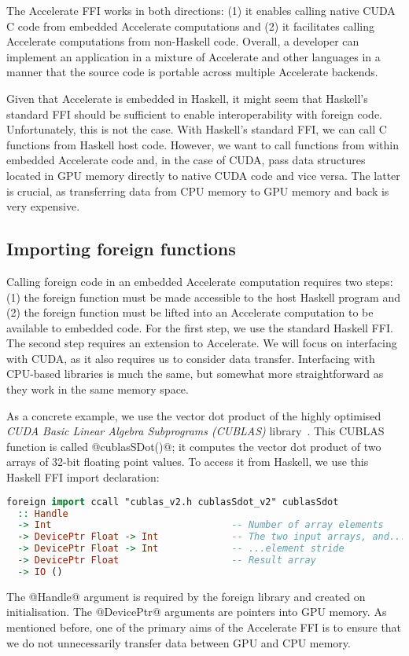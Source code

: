 The Accelerate FFI works in both directions: (1) it enables calling native CUDA C code from embedded Accelerate computations and (2) it facilitates calling Accelerate computations from non-Haskell code. Overall, a developer can implement an application in a mixture of Accelerate and other languages in a manner that the source code is portable across multiple Accelerate backends.

Given that Accelerate is embedded in Haskell, it might seem that Haskell's standard FFI should be sufficient to enable interoperability with foreign code. Unfortunately, this is not the case. With Haskell's standard FFI, we can call C functions from Haskell host code. However, we want to call functions from within embedded Accelerate code and, in the case of CUDA, pass data structures located in GPU memory directly to native CUDA code and vice versa. The latter is crucial, as transferring data from CPU memory to GPU memory and back is very expensive.

\subsection{Importing foreign functions}
\label{sec:foreign-import}

Calling foreign code in an embedded Accelerate computation requires two steps: (1) the foreign function must be made accessible to the host Haskell program and (2) the foreign function must be lifted into an Accelerate computation to be available to embedded code. For the first step, we use the standard Haskell FFI. The second step requires an extension to Accelerate. We will focus on interfacing with CUDA, as it also requires us to consider data transfer. Interfacing with CPU-based libraries is much the same, but somewhat more straightforward as they work in the same memory space.

As a concrete example, we use the vector dot product of the highly optimised \emph{CUDA Basic Linear Algebra Subprograms (CUBLAS)} library~\cite{cublas}. This CUBLAS function is called @cublasSDot()@; it computes the vector dot product of two arrays of 32-bit floating point values. To access it from Haskell, we use this Haskell FFI import declaration:
%
\begin{lstlisting}[language=haskell]
foreign import ccall "cublas_v2.h cublasSdot_v2" cublasSdot
  :: Handle
  -> Int                                -- Number of array elements
  -> DevicePtr Float -> Int             -- The two input arrays, and...
  -> DevicePtr Float -> Int             -- ...element stride
  -> DevicePtr Float                    -- Result array
  -> IO ()
\end{lstlisting}
%
The @Handle@ argument is required by the foreign library and created on
initialisation. The @DevicePtr@ arguments are pointers into GPU memory. As mentioned before, one of the primary aims of the Accelerate FFI is to ensure that we do not unnecessarily transfer data between GPU and CPU memory.

